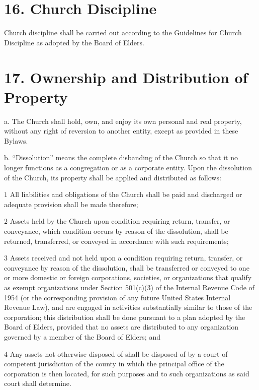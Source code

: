\documentclass[
]{book}
\begin{document}
\hypertarget{church-discipline}{%
\section{16. Church Discipline}\label{church-discipline}}

Church discipline shall be carried out according to the Guidelines for Church Discipline as adopted by the Board of Elders.

\hypertarget{ownership-and-distribution-of-property}{%
\section{17. Ownership and Distribution of Property}\label{ownership-and-distribution-of-property}}

a. The Church shall hold, own, and enjoy its own personal and real property, without any right of reversion to another entity, except as provided in these Bylaws.

b. ``Dissolution'' means the complete disbanding of the Church so that it no longer functions as a congregation or as a corporate entity. Upon the dissolution of the Church, its property shall be applied and distributed as follows:

\(1\) All liabilities and obligations of the Church shall be paid and discharged or adequate provision shall be made therefore;

\(2\) Assets held by the Church upon con­di­tion requiring return, transfer, or conveyance, which condition occurs by reason of the dissol­ution, shall be returned, transferred, or conveyed in accordance with such requirements;

\(3\) Assets received and not held upon a condition requiring return, transfer, or conveyance by reason of the dissolution, shall be transferred or conveyed to one or more domes­tic or foreign corpora­tions, societies, or organizations that qualify as exempt organiza­tions under Section 501(c)(3) of the Internal Revenue Code of 1954 (or the corresponding provi­sion of any future United States Inter­nal Revenue Law), and are engaged in activities sub­stan­tially similar to those of the corpora­tion; this distribution shall be done pursuant to a plan adopted by the Board of Elders, provided that no assets are distributed to any organ­iza­tion governed by a member of the Board of Elders; and

\(4\) Any assets not other­wise disposed of shall be disposed of by a court of competent jurisdiction of the county in which the principal office of the corporation is then located, for such purposes and to such organizations as said court shall determine.
\end{document}

